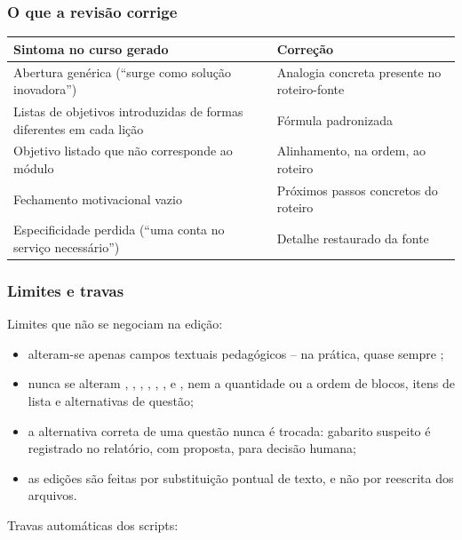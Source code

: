 \documentclass[12pt,a4paper]{article}
\begin{document}
\subsubsection*{O que a revisão corrige}

\begingroup\small
\renewcommand{\arraystretch}{1.3}
\begin{longtable}{@{}L{0.46\textwidth}L{0.48\textwidth}@{}}
\toprule
\textbf{Sintoma no curso gerado} & \textbf{Correção} \\
\midrule
\endhead
Abertura genérica (``surge como solução inovadora'') & Analogia concreta presente no roteiro-fonte \\
Listas de objetivos introduzidas de formas diferentes em cada lição & Fórmula padronizada \\
Objetivo listado que não corresponde ao módulo & Alinhamento, na ordem, ao roteiro \\
Fechamento motivacional vazio & Próximos passos concretos do roteiro \\
Especificidade perdida (``uma conta no serviço necessário'') & Detalhe restaurado da fonte \\
\bottomrule
\end{longtable}
\endgroup

\subsubsection*{Limites e travas}

Limites que não se negociam na edição:

\begin{itemize}[leftmargin=*]
\item alteram-se apenas campos textuais pedagógicos -- na prática, quase sempre ;
\item nunca se alteram , , , , , ,  e , nem a quantidade ou a ordem de blocos, itens de lista e alternativas de questão;
\item a alternativa correta de uma questão nunca é trocada: gabarito suspeito é registrado no relatório, com proposta, para decisão humana;
\item as edições são feitas por substituição pontual de texto, e não por reescrita dos arquivos.
\end{itemize}

Travas automáticas dos scripts:
\end{document}
